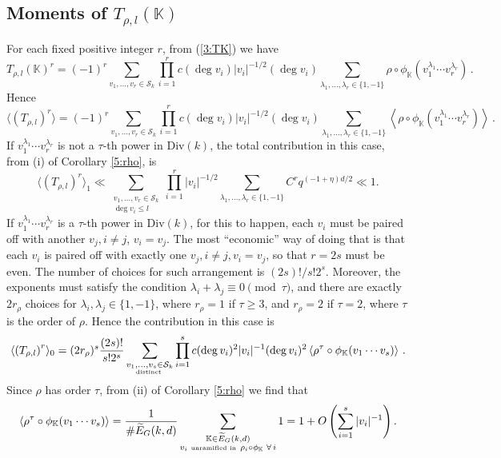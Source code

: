 \documentclass[12pt]{amsart}
\theoremstyle{plain}
\begin{document}
\subsection{Moments of $T_{\rho,l}({{\mathbb K}})$}

For each fixed positive integer $r$, from (\ref{3:TK}) we have
\[ T_{\rho,l}({{\mathbb K}})^r =(-1)^r \sum_{v_1, \ldots, v_r \in {\mathcal{S}_k}} \prod_{i=1}^r c(\deg v_i) |v_i|^{-1/2} (\deg v_i) \sum_{\lambda_1, \ldots, \lambda_r \in \{1,-1\} } \rho \circ {\phi_{{\mathbb K}}} \left(v_1^{\lambda_1} \cdots v_{r}^{\lambda_{r}}\right)\,. \]
Hence
\[\langle \left(T_{\rho,l}\right)^{r} \rangle = (-1)^r \sum_{v_1, \ldots, v_r \in {\mathcal{S}_k}} \prod_{i=1}^r c(\deg v_i) |v_i|^{-1/2} (\deg v_i) \sum_{\lambda_1, \ldots, \lambda_r \in \{1,-1\} } \left\langle \rho \circ {\phi_{{\mathbb K}}} \left(v_1^{\lambda_1} \cdots v_{r}^{\lambda_{r}}\right) \right \rangle \,. \]
If $v_1^{\lambda_1} \cdots v_{r}^{\lambda_{r}}$ is not a $\tau$-th power in ${\mathrm{Div}(k)}$, the total contribution in this case, from (i) of Corollary \ref{5:rho}, is
\[\langle \left(T_{\rho,l} \right)^{r} \rangle_1 \ll \sum_{\substack{v_1, \ldots, v_{r} \in {\mathcal{S}_k}\\
\deg v_i \le l}} \prod_{i=1}^{r} |v_i|^{-1/2} \sum_{\lambda_1, \ldots, \lambda_{r} \in \{1,-1\}} C^r q^{(-1+\eta)d/2} \ll 1. \]
If $v_1^{\lambda_1} \cdots v_{r}^{\lambda_{r}}$ is a $\tau$-th power in ${\mathrm{Div}(k)}$, for this to happen, each $v_i$ must be paired off with another $v_j, i \ne j$, $v_i = v_j$. The most ``economic'' way of doing that is that each $v_i$ is paired off with exactly one $v_j, i \ne j, v_i=v_j$, so that $r=2s$ must be even. The number of choices for such arrangement is $(2s)!/s! 2^s$. Moreover, the exponents must satisfy the condition $\lambda_i+\lambda_j \equiv 0 \pmod{\tau}$, and there are exactly $2 r_{\rho}$ choices for $\lambda_i, \lambda_j \in \{1,-1\}$, where $r_{\rho}=1$ if $\tau \ge 3$, and $r_{\rho}=2$ if $\tau=2$, where $\tau$ is the order of $\rho$. Hence the contribution in this case is
\[\langle \left(T_{\rho,l}\right)^{r} \rangle_0 = (2 r_{\rho})^s\frac{(2s)!}{s! 2^s}\sum_{\substack{v_1, \ldots, v_{s} \in {\mathcal{S}_k} \\
\mbox{\tiny distinct } }} \prod_{i=1}^{s} c(\deg v_i)^2 |v_i|^{-1} (\deg v_i)^2 \left\langle \rho^{\tau} \circ {\phi_{{\mathbb K}}} (v_1 \cdots v_s) \right \rangle \,. \]
Since $\rho$ has order $\tau$, from (ii) of Corollary \ref{5:rho} we find that
\[\left\langle\rho^{\tau} \circ {\phi_{{\mathbb K}}} (v_1 \cdots v_s) \right\rangle=\frac{1}{\#\widetilde{E}_G(k,d)} \sum_{\substack{{{\mathbb K}} \in \widetilde{E}_G(k,d)\\
v_i \,\,\mbox{\tiny unramified in } \, \rho_i \circ {\phi_{{\mathbb K}}} \,\, \forall \, i}}1= 1+O\left(\sum_{i=1}^s |v_i|^{-1}\right).\]
\end{document}
